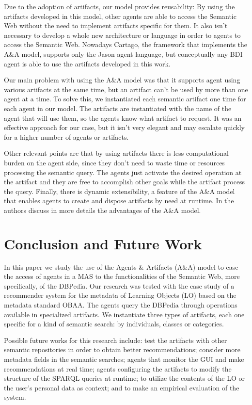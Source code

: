 \documentclass[a4paper,twoside]{article}
\begin{document}
Due to the adoption of artifacts, our model provides reusability: By using the artifacts developed in this model, other agents are able to access the Semantic Web without the need to implement artifacts specific for them. It also isn't necessary to develop a whole new architecture or language in order to agents to access the Semantic Web. Nowadays Cartago, the framework that implements the A\&A model, supports only the Jason agent language, but conceptually any BDI agent is able to use the artifacts developed in this work.

Our main problem with using the A\&A model was that it supports agent using various artifacts at the same time, but an artifact can't be used by more than one agent at a time. To solve this, we instantiated each semantic artifact one time for each agent in our model. The artifacts are instantiated with the name of the agent that will use them, so the agents know what artifact to request. It was an effective approach for our case, but it isn't very elegant and may escalate quickly for a higher number of agents or artifacts.

Other relevant points are that by using artifacts there is less computational burden on the agent side, since they don't need to waste time or resources processing the semantic query. The agents just activate the desired operation at the artifact and they are free to accomplish other goals while the artifact process the query. Finally, there is dynamic extensibility, a feature of the A\&A model that enables agents to create and dispose artifacts by need at runtime. In \cite{ref5} the authors discuss in more details the advantages of the A\&A model.

\section{Conclusion and Future Work}

\noindent In this paper we study the use of the Agents \& Artifacts (A\&A) model to ease the access of agents in a MAS to the functionalities of the Semantic Web, more specifically, of the DBPedia. Our research was tested with the case study of a recommender system for the metadata of Learning Objects (LO) based on the metadata standard OBAA. The agents query the DBPedia through operations available in specialized artifacts. We instantiate three types of artifacts, each one specific for a kind of semantic search: by individuals, classes or categories.

Possible future works for this research include: test the artifacts with other semantic repositories in order to obtain better recommendations; consider more metadata fields in the semantic searches; agents that monitor the GUI and make recommendations at real time; agents configuring the artifacts to modify the structure of the SPARQL queries at runtime; to utilize the contents of the LO or the user's personal data as context; and to make an empirical evaluation of the system.

\vfill

{\small
}

\vfill
\end{document}
